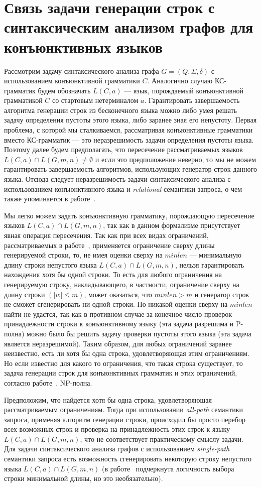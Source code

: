 \section{Связь задачи генерации строк с синтаксическим анализом графов для конъюнктивных языков}

Рассмотрим задачу синтаксического анализа графа $G = (Q, \Sigma, \delta)$ с использованием конъюнктивной грамматики $C$. Аналогично случаю КС-грамматик будем обозначать $L(C,a)$ --- язык, порождаемый конъюнктивной грамматикой $C$ со стартовым нетерминалом $a$. Гарантировать завершаемость алгоритма генерации строк из бесконечного языка можно либо умея решать задачу определения пустоты этого языка, либо заранее зная его непустоту. Первая проблема, с которой мы сталкиваемся, рассматривая конъюнктивные грамматики вместо КС-грамматик --- это неразрешимость задачи определения пустоты языка. Поэтому далее будем предполагать, что пересечение рассматриваемых языков $L(C,a) \cap L(G,m,n) \ne \emptyset$ и если это предположение неверно, то мы не можем гарантировать завершаемость алгоритмов, использующих генератор строк данного языка. Отсюда следует неразрешимость задачи синтаксического анализа с использованием конъюнктивного языка и \textit{relational} семантики запроса, о чем также упоминается в работе~\cite{azimov-spbu-hellings1}.

Мы легко можем задать конъюнктивную грамматику, порождающую пересечение языков $L(C,a) \cap L(G,m,n)$, так как в данном формализме присутствует явная операция пересечения. Так как при всех видах ограничений, рассматриваемых в работе~\cite{azimov-spbu-Okhotin}, применяется ограничение сверху длины генерируемой строки, то, не имея оценки сверху на $minlen$ --- минимальную длину строки непустого языка $L(C,a) \cap L(G,m,n)$, нельзя гарантировать нахождения хотя бы одной строки. То есть для любого ограничения на генерируемую строку, накладывающего, в частности, ограничение сверху на длину строки $(|w| \le m)$, может оказаться, что $minlen > m$ и генератор строк не сможет сгенерировать ни одной строки. Но никакой оценки сверху на $minlen$ найти не удастся, так как в противном случае за конечное число проверок принадлежности строки к конъюнктивному языку (эта задача разрешима и P-полна) можно было бы решить задачу проверки пустоты этого языка (эта задача является неразрешимой). Таким образом, для любых ограничений заранее неизвестно, есть ли хотя бы одна строка, удовлетворяющая этим ограничениям. Но если известно для какого то ограничения, что такая строка существует, то задача генерации строк для конъюнктивных грамматик и этих ограничений, согласно работе~\cite{azimov-spbu-Okhotin}, NP-полна.

Предположим, что найдется хотя бы одна строка, удовлетворяющая рассматриваемым ограничениям. Тогда при использовании \textit{all-path} семантики запроса, применяя алгоритм генерации строки, происходил бы просто перебор всех возможных строк и проверка на принадлежность этих строк к языку $L(C,a) \cap L(G,m,n)$, что не соответствует практическому смыслу задачи. Для задачи синтаксического анализа графов с использованием \textit{single-path} семантики запроса есть возможность сгенерировать некоторую строку непустого языка $L(C,a) \cap L(G,m,n)$ (в работе~\cite{azimov-spbu-hellings2} подчеркнута логичность выбора строки минимальной длины, но это необязательно).
